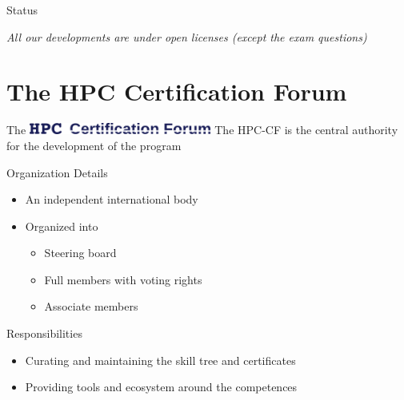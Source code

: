 \documentclass[compress,aspectratio=169]{beamer}
\begin{document}
\begin{frame}{Status}
\medskip

\textit{All our developments are under open licenses (except the exam questions)}
\end{frame}




\section{The HPC Certification Forum}
\sectionIntroHidden

\begin{frame}{The \includegraphics[width=0.45\textwidth]{hpccf-full}}
	The HPC-CF is the central authority for the development of the program

	\begin{block}{Organization Details}
		\begin{itemize}
			\item An independent international body
			\item Organized into
				\begin{itemize}
					\item Steering board
					\item Full members with voting rights
					\item Associate members
				\end{itemize}
		\end{itemize}
	\end{block}

	\begin{block}{Responsibilities}
		\begin{itemize}
			\item Curating and maintaining the skill tree and certificates
			\item Providing tools and ecosystem around the competences
		\end{itemize}
	\end{block}
\end{frame}
\end{document}
